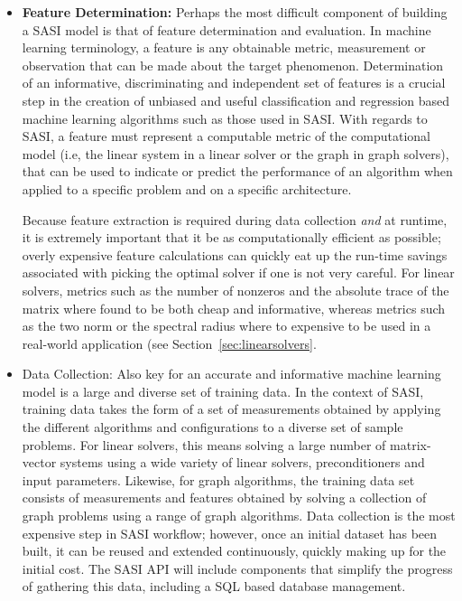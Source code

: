 \begin{itemize}
 \item {\bf Feature Determination:} Perhaps the most difficult component of building a SASI model is that of feature determination and evaluation. In machine learning terminology, a feature is any obtainable metric, measurement or observation that can be made about the target phenomenon. Determination of an informative, discriminating and independent set of features is a crucial step in the creation of unbiased and useful classification and regression based machine learning algorithms such as those used in SASI. With regards to SASI, a feature must represent a computable metric of the computational model (i.e, the linear system in a linear solver or the graph in graph solvers), that can be used to indicate or predict the performance of an algorithm when applied to a specific problem and on a specific architecture. 
 
 Because feature extraction is required during data collection \emph{and} at runtime, it is extremely important that it be as computationally efficient as possible; overly expensive feature calculations can quickly eat up the run-time savings associated with picking the optimal solver if one is not very careful.  For linear solvers, metrics such as the number of nonzeros and the absolute trace of the matrix where found to be both cheap and informative, whereas metrics such as the two norm or the spectral radius where to expensive to be used in a real-world application (see Section~\ref{sec:linearsolvers}. 
 
 \item Data Collection: Also key for an accurate and informative machine learning model is a large and diverse set of training data. In the context of SASI, training data takes the form of a set of measurements obtained by applying the different algorithms and configurations to a diverse set of sample problems. For linear solvers, this means solving a large number of matrix-vector systems using a wide variety of linear solvers, preconditioners and input parameters. Likewise, for graph algorithms, the training data set consists of measurements and features obtained by solving a collection of graph problems using a range of graph algorithms. Data collection is the most expensive step in SASI workflow; however, once an initial dataset has been built, it can be reused and extended continuously, quickly making up for the initial cost. The SASI API will include components that simplify the progress of gathering this data, including a SQL based database management.
 

\end{itemize}
